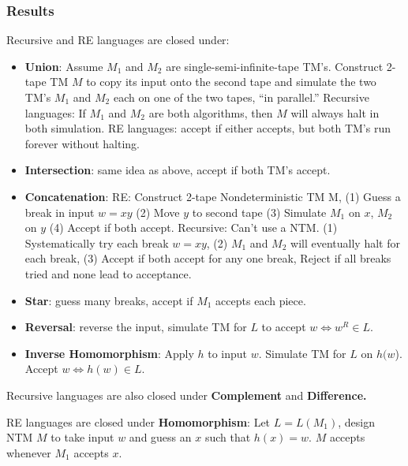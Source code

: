 \subsubsection{Results}
Recursive and RE languages are closed under:
\begin{itemize}
    \item \textbf{Union}: Assume $M_1 $ and $M_2$ are single-semi-infinite-tape TM’s. Construct 2-tape TM $M$ to copy its input onto the second tape and simulate the two TM’s $M_1$ and $M_2$ each on one of the two tapes, “in parallel.” Recursive languages: If $M_1$ and $M_2$ are both algorithms, then $M$ will always halt in both simulation. RE languages: accept if either accepts, but both TM’s run forever without halting.
    \item \textbf{Intersection}: same idea as above, accept if both TM's accept.
    \item \textbf{Concatenation}: RE: Construct 2-tape Nondeterministic TM M, (1) Guess a break in input $w = xy$ (2) Move $y$ to second tape (3) Simulate $M_1$ on $x$, $M_2$ on $y$ (4) Accept if both accept. Recursive: Can’t use a NTM. (1) Systematically try each break $w = xy$, (2) $M_1$ and $M_2$ will eventually halt for each break, (3) Accept if both accept for any one break, Reject if all breaks tried and none lead to acceptance.
    \item \textbf{Star}: guess many breaks, accept if $M_1$ accepts each piece.
    \item \textbf{Reversal}: reverse the input, simulate TM for $L$ to accept $w \iff w^R\in L$.
    \item \textbf{Inverse Homomorphism}: Apply $h$ to input $w$. Simulate TM for $L$ on  $h(w$). Accept $w\iff h(w) \in L$.

\end{itemize}
Recursive languages are also closed under \textbf{Complement} and \textbf{Difference.}

RE languages are closed under \textbf{Homomorphism}: Let $L = L(M_1)$, design NTM $M$ to take input $w$ and guess an $x$ such that $h(x) = w$. $M$ accepts whenever $M_1$ accepts $x$.

